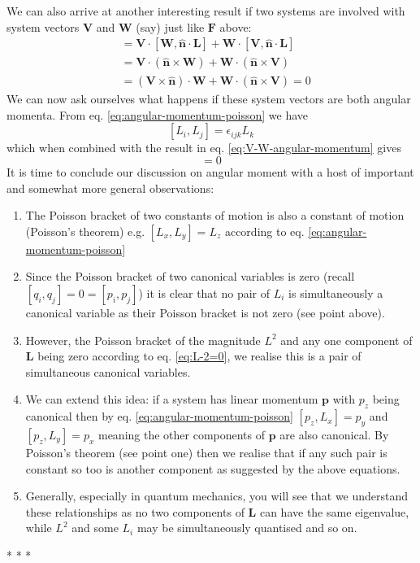 \documentclass[english,seminar,headertitle]{lecture}
\begin{document}
We can also arrive at another interesting result if two systems are involved with system vectors $\mathbf{V}$ and $\mathbf{W}$ (say) just like $\mathbf{F}$ above:
\begin{align}
	[\mathbf{V\cdot W},\mathbf{\hat{n}\cdot L}] &= \mathbf{V} \cdot [\mathbf{W}, \mathbf{\hat{n}\cdot L}] + \mathbf{W} \cdot [\mathbf{V}, \mathbf{\hat{n}\cdot L}] \nonumber\\
	&= \mathbf{V} \cdot \left(\mathbf{\hat{n} \times W} \right) + \mathbf{W} \cdot \left(\mathbf{\hat{n} \times V} \right) \nonumber\\
	&= \left( \mathbf{V} \times \mathbf{\hat{n}} \right) \cdot \mathbf{W} + \mathbf{W} \cdot \left(\mathbf{\hat{n} \times V} \right) = 0 \label{eq:V-W-angular-momentum}
\end{align}%
We can now ask ourselves what happens if these system vectors are both angular momenta. From eq. \eqref{eq:angular-momentum-poisson} we have
\[
	[L_i, L_j] = \epsilon_{ijk} L_k
\]
which when combined with the result in eq. \eqref{eq:V-W-angular-momentum} gives
\begin{equation}
	[\mathbf{L}^2 , \mathbf{\hat{n}\cdot L}] = 0 \label{eq:L-2=0}
\end{equation}%
It is time to conclude our discussion on angular moment with a host of important and somewhat more general observations:
\begin{enumerate}
	\item The Poisson bracket of two constants of motion is also a constant of motion (Poisson's theorem) e.g. $[L_x,L_y] = L_z$ according to eq. \eqref{eq:angular-momentum-poisson}
	\item Since the Poisson bracket of two canonical variables is zero (recall $[q_i,q_j] = 0 = [p_i,p_j]$) it is clear that no pair of $L_i$ is simultaneously a canonical variable as their Poisson bracket is not zero (see point above).
	\item However, the Poisson bracket of the magnitude $L^2$ and any one component of $\mathbf{L}$ being zero according to eq. \eqref{eq:L-2=0}, we realise this is a pair of simultaneous canonical variables.
	\item We can extend this idea: if a system has linear momentum $\mathbf{p}$ with $p_z$ being canonical then by eq. \eqref{eq:angular-momentum-poisson} $[p_z, L_x] = p_y$ and $[p_z, L_y] = p_x$ meaning the other components of $\mathbf{p}$ are also canonical.  By Poisson’s theorem (see point one) then we realise that if any such pair is constant so too is another component as suggested by the above equations. 
	\item Generally, especially in quantum mechanics, you will see that we understand these relationships as no two components of $\mathbf{L}$ can have the same eigenvalue, while $L^2$ and some $L_i$ may be simultaneously quantised and so on.
\end{enumerate}

\vspace*{1.5cm}
{\centering
* \; * \; *

}
\end{document}
